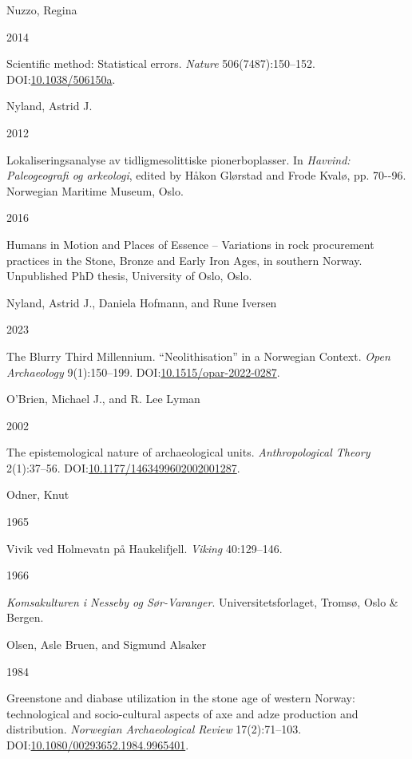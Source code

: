 \documentclass[
  12pt,
  a4paper,
  oneside]{book}
\newlength{\cslhangindent}
\newlength{\csllabelwidth}
\newlength{\cslentryspacingunit} %
\newenvironment{CSLReferences}[2] %
 {%
  \setlength{\parindent}{0pt}
  \ifodd #1
  \let\oldpar\par
  \def\par{\hangindent=\cslhangindent\oldpar}
  \fi
  \setlength{\parskip}{#2\cslentryspacingunit}
 }%
 {}
\newcommand{\CSLBlock}[1]{#1\hfill\break}
\newcommand{\CSLLeftMargin}[1]{\parbox[t]{\csllabelwidth}{#1}}
\newcommand{\CSLRightInline}[1]{\parbox[t]{\linewidth - \csllabelwidth}{#1}\break}
\begin{document}
\begin{CSLReferences}{0}{0}
\leavevmode{}%
\CSLBlock{Nuzzo, Regina}
\CSLLeftMargin{ 2014}%
\CSLRightInline{{Scientific method: Statistical errors}. \emph{Nature} 506(7487):150--152. DOI:\href{https://doi.org/10.1038/506150a}{10.1038/506150a}.}

\leavevmode{}%
\CSLBlock{Nyland, Astrid J.}
\CSLLeftMargin{ 2012}%
\CSLRightInline{{Lokaliseringsanalyse av tidligmesolittiske pionerboplasser}. In \emph{{Havvind: Paleogeografi og arkeologi}}, edited by Håkon Glørstad and Frode Kvalø, pp. 70-\/-96. Norwegian Maritime Museum, Oslo.}

\leavevmode{}%
\CSLLeftMargin{ 2016 }%
\CSLRightInline{{Humans in Motion and Places of Essence -- Variations in rock procurement practices in the Stone, Bronze and Early Iron Ages, in southern Norway}. Unpublished PhD thesis, University of Oslo, Oslo.}

\leavevmode{}%
\CSLBlock{Nyland, Astrid J., Daniela Hofmann, and Rune Iversen}
\CSLLeftMargin{ 2023}%
\CSLRightInline{{The Blurry Third Millennium. {``Neolithisation''} in a Norwegian Context}. \emph{Open Archaeology} 9(1):150--199. DOI:\href{https://doi.org/10.1515/opar-2022-0287}{10.1515/opar-2022-0287}.}

\leavevmode{}%
\CSLBlock{O'Brien, Michael J., and R. Lee Lyman}
\CSLLeftMargin{ 2002}%
\CSLRightInline{{The epistemological nature of archaeological units}. \emph{Anthropological Theory} 2(1):37--56. DOI:\href{https://doi.org/10.1177/1463499602002001287}{10.1177/1463499602002001287}.}

\leavevmode{}%
\CSLBlock{Odner, Knut}
\CSLLeftMargin{ 1965}%
\CSLRightInline{{Vivik ved Holmevatn på Haukelifjell}. \emph{Viking} 40:129--146.}

\leavevmode{}%
\CSLLeftMargin{ 1966 }%
\CSLRightInline{\emph{{Komsakulturen i Nesseby og Sør-Varanger}}. Universitetsforlaget, Tromsø, Oslo \& Bergen.}

\leavevmode{}%
\CSLBlock{Olsen, Asle Bruen, and Sigmund Alsaker}
\CSLLeftMargin{ 1984}%
\CSLRightInline{Greenstone and diabase utilization in the stone age of western Norway: technological and socio-cultural aspects of axe and adze production and distribution. \emph{Norwegian Archaeological Review} 17(2):71--103. DOI:\href{https://doi.org/10.1080/00293652.1984.9965401}{10.1080/00293652.1984.9965401}.}


\end{CSLReferences}
\end{document}
